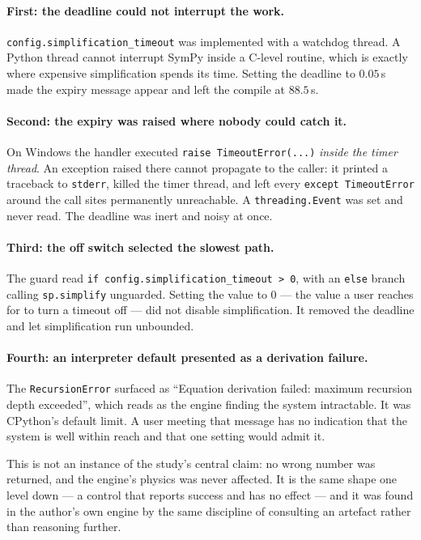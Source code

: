 \documentclass[11pt,a4paper]{article}
\newcommand{\code}[1]{\texttt{\small #1}}
\begin{document}
\paragraph{First: the deadline could not interrupt the work.}
\code{config.simplification\_timeout} was implemented with a watchdog thread. A
Python thread cannot interrupt SymPy inside a C-level routine, which is exactly
where expensive simplification spends its time. Setting the deadline to
$0.05$\,s made the expiry message appear and left the compile at $88.5$\,s.

\paragraph{Second: the expiry was raised where nobody could catch it.}
On Windows the handler executed \code{raise TimeoutError(...)} \emph{inside the
timer thread}. An exception raised there cannot propagate to the caller: it
printed a traceback to \code{stderr}, killed the timer thread, and left every
\code{except TimeoutError} around the call sites permanently unreachable. A
\code{threading.Event} was set and never read. The deadline was inert and noisy
at once.

\paragraph{Third: the off switch selected the slowest path.}
The guard read \code{if config.simplification\_timeout > 0}, with an
\code{else} branch calling \code{sp.simplify} unguarded. Setting the value to
$0$ --- the value a user reaches for to turn a timeout off --- did not disable
simplification. It removed the deadline and let simplification run unbounded.

\paragraph{Fourth: an interpreter default presented as a derivation failure.}
The \code{RecursionError} surfaced as ``Equation derivation failed: maximum
recursion depth exceeded'', which reads as the engine finding the system
intractable. It was CPython's default limit. A user meeting that message has no
indication that the system is well within reach and that one setting would
admit it.

\medskip
\noindent This is not an instance of the study's central claim: no wrong number
was returned, and the engine's physics was never affected. It is the same shape
one level down --- a control that reports success and has no effect --- and it
was found in the author's own engine by the same discipline of consulting an
artefact rather than reasoning further.
\end{document}

